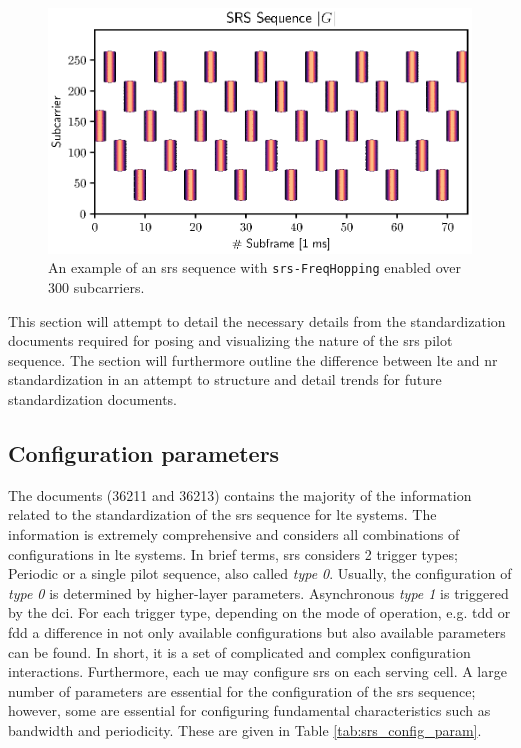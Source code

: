 \begin{figure}
    \centering
    \includegraphics{chapters/part_uplink/figures/srs_pilot_example.eps}
    \caption{An example of an \gls{srs} sequence with \texttt{srs-FreqHopping} enabled over $300$ subcarriers.}
    \label{fig:srs_pilot_example}
\end{figure}


This section will attempt to detail the necessary details from the standardization documents required for posing and visualizing the nature of the \gls{srs} pilot sequence. The section will furthermore outline the difference between \gls{lte} and \gls{nr} standardization in an attempt to structure and detail trends for future standardization documents. 

\subsection{Configuration parameters}
The documents \cite{36211,3GPP2020TS15} (36211 and 36213) contains the majority of the information related to the standardization of the \gls{srs} sequence for \gls{lte} systems. The information is extremely comprehensive and considers all combinations of configurations in \gls{lte} systems. In brief terms, \gls{srs} considers 2 trigger types; Periodic or a single pilot sequence, also called \emph{type 0}. Usually, the configuration of \emph{type 0} is determined by higher-layer parameters. Asynchronous \emph{type 1} is triggered by the \gls{dci}. For each trigger type, depending on the mode of operation, e.g. \gls{tdd} or \gls{fdd} a difference in not only available configurations but also available parameters can be found. In short, it is a set of complicated and complex configuration interactions. Furthermore, each \gls{ue} may configure \gls{srs} on each serving cell. A large number of parameters are essential for the configuration of the \gls{srs} sequence; however, some are essential for configuring fundamental characteristics such as bandwidth and periodicity. These are given in Table \ref{tab:srs_config_param}.

